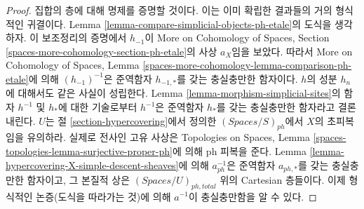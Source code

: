 \begin{proof}
집합의 층에 대해 명제를 증명할 것이다. 이는 이미 확립한 결과들의
거의 형식적인 귀결이다. Lemma
\ref{lemma-compare-simplicial-objects-ph-etale}의 도식을 생각하자.
이 보조정리의 증명에서 $h_{-1}$이 More on Cohomology of Spaces,
Section \ref{spaces-more-cohomology-section-ph-etale}의 사상
$a_X$임을 보았다. 따라서 More on Cohomology of Spaces, Lemma
\ref{spaces-more-cohomology-lemma-comparison-ph-etale}에 의해
$(h_{-1})^{-1}$은 준역함자 $h_{-1, *}$를 갖는 충실충만한 함자이다.
$h$의 성분 $h_n$에 대해서도 같은 사실이 성립한다.
Lemma \ref{lemma-morphism-simplicial-sites}의 함자
$h^{-1}$ 및 $h_*$에 대한 기술로부터 $h^{-1}$은
준역함자 $h_*$를 갖는 충실충만한 함자라고 결론 내린다.
$U$는 절 \ref{section-hypercovering}에서 정의한
$(\textit{Spaces}/S)_{ph}$에서 $X$의 초피복임을 유의하라.
실제로 전사인 고유 사상은 Topologies on Spaces, Lemma
\ref{spaces-topologies-lemma-surjective-proper-ph}에 의해 ph 피복을 준다.
Lemma \ref{lemma-hypercovering-X-simple-descent-sheaves}에 의해
$a_{ph}^{-1}$은 준역함자 $a_{ph, *}$를 갖는 충실충만한 함자이고,
그 본질적 상은 $(\textit{Spaces}/U)_{ph, total}$ 위의
Cartesian 층들이다. 이제 형식적인 논증(도식을 따라가는 것)에 의해
$a^{-1}$이 충실충만함을 알 수 있다.


\end{proof}

